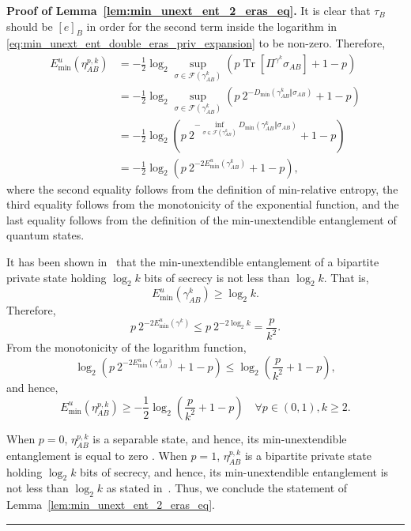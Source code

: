 \documentclass[twocolumn,letterpaper, dvipsnames,allowtoday, accepted = 2025-12-31]{quantumarticle}
\newenvironment{proof}[1][Proof]{\noindent\textbf{#1.} }{\ \rule{0.5em}{0.5em}}
\begin{document}
\begin{proof}[Proof of Lemma~\ref{lem:min_unext_ent_2_eras_eq}]
It is clear that $\tau_{B}$ should be $[e]_{B}$ in order for the second term inside the logarithm in \eqref{eq:min_unext_ent_double_eras_priv_expansion} to be non-zero. Therefore,
\begin{align}
    E^u_{\min}\!\left(\eta^{p,k}_{AB}\right)
    &= -\frac{1}{2}\log_2 \sup_{\sigma\in \mathcal{F}\left(\gamma^k_{AB}\right)}\left(p\operatorname{Tr}\!\left[\Pi^{\gamma^k}\sigma_{AB}\right] + 1-p\right)\\
    &= -\frac{1}{2}\log_2 \sup_{\sigma\in \mathcal{F}\left(\gamma^k_{AB}\right)}\left(p~ 2^{-D_{\min}\!\left(\gamma^k_{AB}\Big\Vert\sigma_{AB}\right)} + 1-p\right)\\
    &= -\frac{1}{2}\log_2 \left(p~2^{-\inf_{\sigma\in \mathcal{F}\left(\gamma^k_{AB}\right)}D_{\min}\!\left(\gamma^k_{AB}\Big\Vert\sigma_{AB}\right)}+ 1-p\right)\\
    &= -\frac{1}{2}\log_2 \left(p~2^{-2E^u_{\min}\!\left(\gamma^k_{AB}\right)}+ 1-p\right),
\end{align}
where the second equality follows from the definition of min-relative entropy, the third equality follows from the monotonicity of the exponential function, and the last equality follows from the definition of the min-unextendible entanglement of quantum states.

It has been shown in~\cite[Corollary 22]{WWW21} that the min-unextendible entanglement of a bipartite private state holding $\log_2 k$ bits of secrecy is not less than $\log_2 k$. That is,
\begin{equation}
    E^u_{\min}\!\left(\gamma^k_{AB}\right) \ge \log_2 k.
\end{equation}
Therefore,
\begin{equation}
    p~2^{-2E^u_{\min}\!\left(\gamma^k\right)} \le p~2^{-2\log_2 k} = \frac{p}{k^2}.
\end{equation}
From the monotonicity of the logarithm function, 
\begin{equation}
    \log_2 \left(p~2^{-2E^u_{\min}\!\left(\gamma^k_{AB}\right)}+ 1-p\right)
    \le \log_2\left(\frac{p}{k^2} + 1-p\right),
\end{equation}
and hence,
\begin{equation}
    E^u_{\min}\!\left(\eta^{p,k}_{AB}\right) \ge -\frac{1}{2}\log_2\left(\frac{p}{k^2} + 1-p\right) \quad \forall p\in (0,1), k\ge 2.
\end{equation}

When $p=0$, $\eta^{p,k}_{AB}$ is a separable state, and hence, its min-unextendible entanglement is equal to zero \cite[Proposition~3]{WWW21}. When $p=1$, $\eta^{p,k}_{AB}$ is a bipartite private state holding $\log_2 k$ bits of secrecy, and hence, its min-unextendible entanglement is not less than $\log_2 k$ as stated in~\cite[Corollary 22]{WWW21}. Thus, we conclude the statement of Lemma~\ref{lem:min_unext_ent_2_eras_eq}.
\end{proof}
\end{document}
